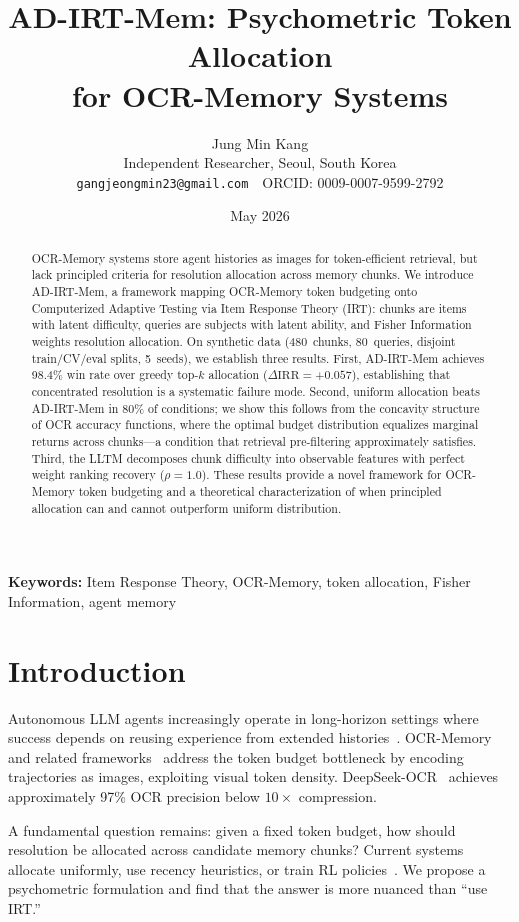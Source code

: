 \documentclass{article}
\title{AD-IRT-Mem: Psychometric Token Allocation\\for OCR-Memory Systems}
\author{
  Jung Min Kang \\
  Independent Researcher, Seoul, South Korea \\
  \texttt{gangjeongmin23@gmail.com}\ \ ORCID: 0009-0007-9599-2792
}
\date{May 2026}
\begin{document}
\maketitle

\begin{abstract}
OCR-Memory systems store agent histories as images for token-efficient retrieval, but lack principled criteria for resolution allocation across memory chunks. We introduce AD-IRT-Mem, a framework mapping OCR-Memory token budgeting onto Computerized Adaptive Testing via Item Response Theory (IRT): chunks are items with latent difficulty, queries are subjects with latent ability, and Fisher Information weights resolution allocation. On synthetic data (480~chunks, 80~queries, disjoint train/CV/eval splits, 5~seeds), we establish three results. First, AD-IRT-Mem achieves 98.4\% win rate over greedy top-$k$ allocation ($\Delta\mathrm{IRR} = +0.057$), establishing that concentrated resolution is a systematic failure mode. Second, uniform allocation beats AD-IRT-Mem in 80\% of conditions; we show this follows from the concavity structure of OCR accuracy functions, where the optimal budget distribution equalizes marginal returns across chunks---a condition that retrieval pre-filtering approximately satisfies. Third, the LLTM decomposes chunk difficulty into observable features with perfect weight ranking recovery ($\rho = 1.0$). These results provide a novel framework for OCR-Memory token budgeting and a theoretical characterization of when principled allocation can and cannot outperform uniform distribution.
\end{abstract}

\noindent\textbf{Keywords:} Item Response Theory, OCR-Memory, token allocation, Fisher Information, agent memory

\section{Introduction}

Autonomous LLM agents increasingly operate in long-horizon settings where success depends on reusing experience from extended histories~\citep{li2026ocr,feng2026agentocr}. OCR-Memory~\citep{li2026ocr} and related frameworks~\citep{shi2026memocr,feng2026agentocr} address the token budget bottleneck by encoding trajectories as images, exploiting visual token density. DeepSeek-OCR~\citep{wei2025deepseekocr} achieves approximately 97\% OCR precision below $10\times$ compression.

A fundamental question remains: given a fixed token budget, how should resolution be allocated across candidate memory chunks? Current systems allocate uniformly, use recency heuristics, or train RL policies~\citep{shi2026memocr}. We propose a psychometric formulation and find that the answer is more nuanced than ``use IRT.''
\end{document}

